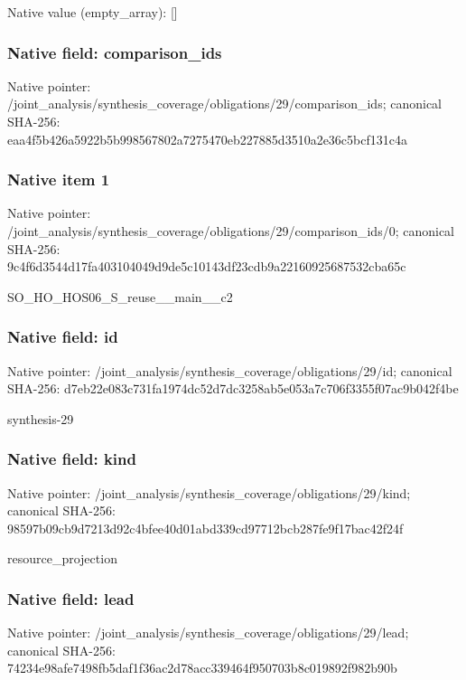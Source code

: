 \documentclass[10pt,a4paper]{article}
\begin{document}
Native value (empty\_\allowbreak{}array): []

\subsubsection{Native field: comparison\_\allowbreak{}ids}
Native pointer: /joint\_\allowbreak{}analysis/synthesis\_\allowbreak{}coverage/obligations/29/comparison\_\allowbreak{}ids; canonical SHA-256: eaa4f5b426a5922b5b998567802a7275470eb227885d3510a2e36c5bcf131c4a

\subsubsection{Native item 1}
Native pointer: /joint\_\allowbreak{}analysis/synthesis\_\allowbreak{}coverage/obligations/29/comparison\_\allowbreak{}ids/0; canonical SHA-256: 9c4f6d3544d17fa403104049d9de5c10143df23cdb9a22160925687532cba65c

\begingroup\raggedright\sloppy SO\_\allowbreak{}HO\_\allowbreak{}HOS06\_\allowbreak{}S\_\allowbreak{}reuse\_\allowbreak{}\_\allowbreak{}main\_\allowbreak{}\_\allowbreak{}c2\par\endgroup

\subsubsection{Native field: id}
Native pointer: /joint\_\allowbreak{}analysis/synthesis\_\allowbreak{}coverage/obligations/29/id; canonical SHA-256: d7eb22e083c731fa1974dc52d7dc3258ab5e053a7c706f3355f07ac9b042f4be

\begingroup\raggedright\sloppy synthesis-29\par\endgroup

\subsubsection{Native field: kind}
Native pointer: /joint\_\allowbreak{}analysis/synthesis\_\allowbreak{}coverage/obligations/29/kind; canonical SHA-256: 98597b09cb9d7213d92c4bfee40d01abd339cd97712bcb287fe9f17bac42f24f

\begingroup\raggedright\sloppy resource\_\allowbreak{}projection\par\endgroup

\subsubsection{Native field: lead}
Native pointer: /joint\_\allowbreak{}analysis/synthesis\_\allowbreak{}coverage/obligations/29/lead; canonical SHA-256: 74234e98afe7498fb5daf1f36ac2d78acc339464f950703b8c019892f982b90b
\end{document}
